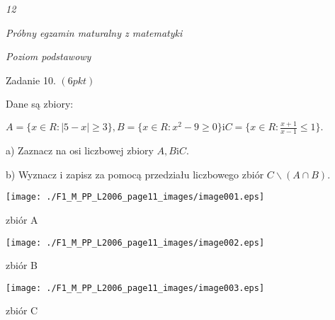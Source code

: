 \documentclass[a4paper,12pt]{article}
\begin{document}
{\it 12}

{\it Próbny egzamin maturalny z matematyki}

{\it Poziom podstawowy}

Zadanie 10. $(6pkt)$

Dane są zbiory:

$A=\{x\in R:|5-x|\geq 3\}, B=\{x\in R:x^{2}-9\geq 0\} \mathrm{i} C=\displaystyle \{x\in R:\frac{x+1}{x-1}\leq 1\}.$

a) Zaznacz na osi liczbowej zbiory $A, B \mathrm{i}C.$

b) Wyznacz i zapisz za pomocą przedziału liczbowego zbiór $C\backslash (A\cap B).$
\begin{center}
\texttt{[image: ./F1\_M\_PP\_L2006\_page11\_images/image001.eps]}
\end{center}
zbiór A
\begin{center}
\texttt{[image: ./F1\_M\_PP\_L2006\_page11\_images/image002.eps]}
\end{center}
zbiór B
\begin{center}
\texttt{[image: ./F1\_M\_PP\_L2006\_page11\_images/image003.eps]}
\end{center}
zbiór C
\end{document}
